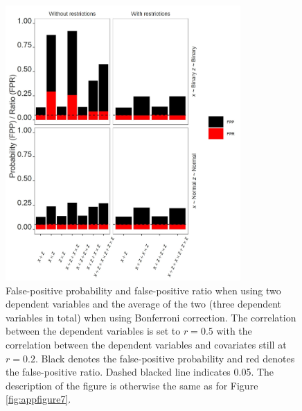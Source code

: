 \begin{figure}[ht!]
\includegraphics[width=0.8\textwidth]{R/Analysis/Result/Figures/Figure3SIBon.jpeg}
\centering
\caption{False-positive probability and false-positive ratio when using two dependent variables and the average of the two (three dependent variables in total) when using Bonferroni correction. The correlation between the dependent variables is set to  $\textit{r}=0.5$ with the correlation between the dependent variables and covariates still at  $\textit{r}=0.2$. Black denotes the false-positive probability and red denotes the false-positive ratio. Dashed blacked line indicates 0.05. The description of the figure is otherwise the same as for Figure \ref{fig:appfigure7}.}
\label{fig:appfigure9}
\end{figure}


